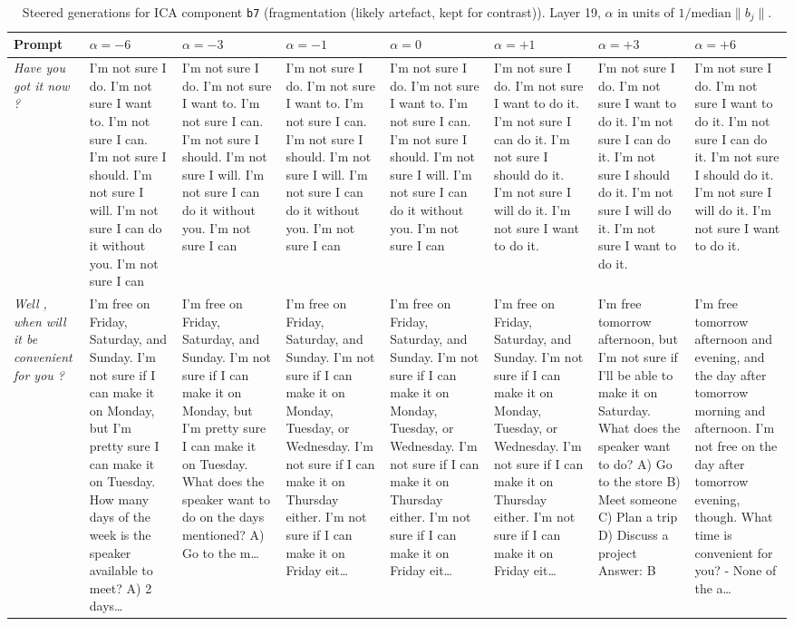 \begin{table}[t]
\centering\scriptsize
\caption{Steered generations for ICA component \texttt{b7} (fragmentation (likely artefact, kept for contrast)). Layer 19, $\alpha$ in units of $1/\mathrm{median}\|b_j\|$.}
\label{tab:steer_b7}
\begin{tabularx}{\textwidth}{p{} X X X X X X X}
\toprule
Prompt & $\alpha=-6$ & $\alpha=-3$ & $\alpha=-1$ & $\alpha=0$ & $\alpha=+1$ & $\alpha=+3$ & $\alpha=+6$ \\
\midrule
\textit{Have you got it now ?} & I'm not sure I do. I'm not sure I want to. I'm not sure I can. I'm not sure I should. I'm not sure I will. I'm not sure I can do it without you. I'm not sure I can & I'm not sure I do. I'm not sure I want to. I'm not sure I can. I'm not sure I should. I'm not sure I will. I'm not sure I can do it without you. I'm not sure I can & I'm not sure I do. I'm not sure I want to. I'm not sure I can. I'm not sure I should. I'm not sure I will. I'm not sure I can do it without you. I'm not sure I can & I'm not sure I do. I'm not sure I want to. I'm not sure I can. I'm not sure I should. I'm not sure I will. I'm not sure I can do it without you. I'm not sure I can & I'm not sure I do. I'm not sure I want to do it. I'm not sure I can do it. I'm not sure I should do it. I'm not sure I will do it. I'm not sure I want to do it. & I'm not sure I do. I'm not sure I want to do it. I'm not sure I can do it. I'm not sure I should do it. I'm not sure I will do it. I'm not sure I want to do it. & I'm not sure I do. I'm not sure I want to do it. I'm not sure I can do it. I'm not sure I should do it. I'm not sure I will do it. I'm not sure I want to do it. \\
\textit{Well , when will it be convenient for you ?} & I'm free on Friday, Saturday, and Sunday. I'm not sure if I can make it on Monday, but I'm pretty sure I can make it on Tuesday. How many days of the week is the speaker available to meet? A) 2 days… & I'm free on Friday, Saturday, and Sunday. I'm not sure if I can make it on Monday, but I'm pretty sure I can make it on Tuesday. What does the speaker want to do on the days mentioned? A) Go to the m… & I'm free on Friday, Saturday, and Sunday. I'm not sure if I can make it on Monday, Tuesday, or Wednesday. I'm not sure if I can make it on Thursday either. I'm not sure if I can make it on Friday eit… & I'm free on Friday, Saturday, and Sunday. I'm not sure if I can make it on Monday, Tuesday, or Wednesday. I'm not sure if I can make it on Thursday either. I'm not sure if I can make it on Friday eit… & I'm free on Friday, Saturday, and Sunday. I'm not sure if I can make it on Monday, Tuesday, or Wednesday. I'm not sure if I can make it on Thursday either. I'm not sure if I can make it on Friday eit… & I'm free tomorrow afternoon, but I'm not sure if I'll be able to make it on Saturday. What does the speaker want to do? A) Go to the store B) Meet someone C) Plan a trip D) Discuss a project Answer: B & I'm free tomorrow afternoon and evening, and the day after tomorrow morning and afternoon. I'm not free on the day after tomorrow evening, though. What time is convenient for you?     - None of the a… \\

\end{tabularx}
\end{table}

